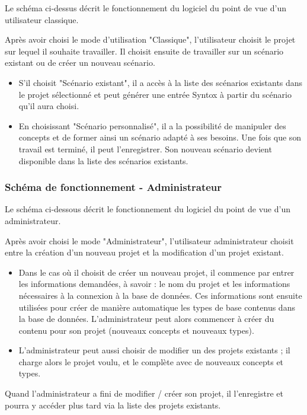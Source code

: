 \documentclass[12pt]{report}
\begin{document}
	Le schéma ci-dessus décrit le fonctionnement du logiciel du point de vue d'un utilisateur classique.
	
	Après avoir choisi le mode d'utilisation "Classique", l'utilisateur choisit le projet sur lequel il souhaite travailler. Il choisit ensuite de travailler sur un scénario existant ou de créer un nouveau scénario. 
	\begin{itemize}
	\item S'il choisit "Scénario existant", il a accès à la liste des scénarios existants dans le projet sélectionné et peut générer une entrée Syntox à partir du scénario qu'il aura choisi.
	\item En choisissant "Scénario personnalisé", il a la possibilité de manipuler des concepts et de former ainsi un scénario adapté à ses besoins. Une fois que son travail est terminé, il peut l'enregistrer. Son nouveau scénario devient disponible dans la liste des scénarios existants.
	\end{itemize}

	\subsubsection{Schéma de fonctionnement - Administrateur}
	
	Le schéma ci-dessous décrit le fonctionnement du logiciel du point de vue d'un administrateur.
	
	Après avoir choisi le mode "Administrateur", l'utilisateur administrateur choisit entre la création d'un nouveau projet et la modification d'un projet existant. 
	\begin{itemize}
	\item Dans le cas où il choisit de créer un nouveau projet, il commence par entrer les informations demandées, à savoir : le nom du projet et les informations nécessaires à la connexion à la base de données.
	Ces informations sont ensuite utilisées pour créer de manière automatique les types de base contenus dans la base de données. L'administrateur peut alors commencer à créer du contenu pour son projet (nouveaux concepts et nouveaux types).
	\item L'administrateur peut aussi choisir de modifier un des projets existants ; il charge alors le projet voulu, et le complète avec de nouveaux concepts et types.
	\end{itemize}
	Quand l'administrateur a fini de modifier / créer son projet, il l'enregistre et pourra y accéder plus tard via la liste des projets existants.
	
\end{document}
